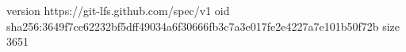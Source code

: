 version https://git-lfs.github.com/spec/v1
oid sha256:3649f7ce62232bf5dff49034a6f30666fb3c7a3e017fe2e4227a7e101b50f72b
size 3651
